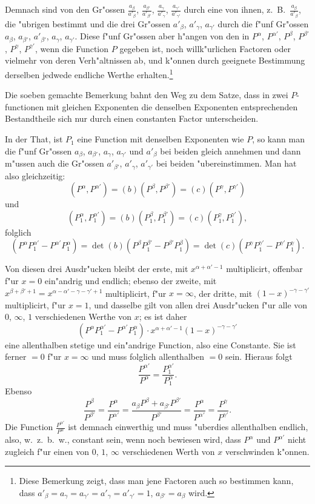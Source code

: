 \documentclass[12pt,a4paper]{article}
\begin{document}
Demnach sind von den Gr{"o}ssen $\frac{a_{\beta}}{a'_{\beta}}$, $\frac{a_{\beta'}}{a'_{\beta'}}$, $\frac{a_{\gamma}}{a'_{\gamma}}$, $\frac{a_{\gamma'}}{a'_{\gamma'}}$ durch eine von ihnen, z.~B.\ $\frac{a_{\beta}}{a'_{\beta}}$, die {"u}brigen bestimmt und die drei Gr{"o}ssen $a'_{\beta}$, $a'_{\gamma}$, $a_{\gamma'}$ durch die f{"u}nf Gr{"o}ssen $a_{\beta}$, $a_{\beta'}$, $a'_{\beta'}$, $a_{\gamma}$, $a_{\gamma'}$. Diese f{"u}nf Gr{"o}ssen aber h{"a}ngen von den in $P^{\alpha}$, $P^{\alpha'}$, $P^{\beta}$, $P^{\beta'}$, $P^{\gamma}$, $P^{\gamma'}$, wenn die Function $P$ gegeben ist, noch willk{"u}rlichen Factoren oder vielmehr von deren Verh{"a}ltnissen ab, und k{"o}nnen durch geeignete Bestimmung derselben jedwede endliche Werthe erhalten.\footnote{Diese Bemerkung zeigt, dass man jene Factoren auch so bestimmen kann, dass $a'_{\beta} = a_{\gamma} = a_{\gamma'} = a'_{\gamma} = a'_{\gamma'} = 1$, $a_{\beta'} = a_{\beta}$ wird.}

Die soeben gemachte Bemerkung bahnt den Weg zu dem Satze, dass in zwei $P$-functionen mit gleichen Exponenten die denselben Exponenten entsprechenden Bestandtheile sich nur durch einen constanten Factor unterscheiden.

In der That, ist $P_1$ eine Function mit denselben Exponenten wie $P$, so kann man die f{"u}nf Gr{"o}ssen $a_{\beta}$, $a_{\beta'}$, $a_{\gamma}$, $a_{\gamma'}$ und $a'_{\beta}$ bei beiden gleich annehmen und dann m{"u}ssen auch die Gr{"o}ssen $a'_{\beta'}$, $a'_{\gamma}$, $a'_{\gamma'}$ bei beiden {"u}bereinstimmen. Man hat also gleichzeitig:
\[
(P^{\alpha}, P^{\alpha'}) = (b)(P^{\beta}, P^{\beta'}) = (c)(P^{\gamma}, P^{\gamma'})
\]
und
\[
(P_1^{\alpha}, P_1^{\alpha'}) = (b)(P_1^{\beta}, P_1^{\beta'}) = (c)(P_1^{\gamma}, P_1^{\gamma'}),
\]
folglich
\[
(P^{\alpha} P_1^{\alpha'} - P^{\alpha'} P_1^{\alpha}) = \det(b)(P^{\beta} P_1^{\beta'} - P^{\beta'} P_1^{\beta}) = \det(c)(P^{\gamma} P_1^{\gamma'} - P^{\gamma'} P_1^{\gamma}).
\]

Von diesen drei Ausdr{"u}cken bleibt der erste, mit $x^{\alpha+\alpha'-1}$ multiplicirt, offenbar f{"u}r $x = 0$ ein{"a}ndrig und endlich; ebenso der zweite, mit $x^{\beta+\beta'+1} = x^{\alpha-\alpha'-\gamma-\gamma'+1}$ multiplicirt, f{"u}r $x = \infty$, der dritte, mit $(1-x)^{-\gamma-\gamma'}$ multiplicirt, f{"u}r $x = 1$, und dasselbe gilt von allen drei Ausdr{"u}cken f{"u}r alle von $0$, $\infty$, $1$ verschiedenen Werthe von $x$; es ist daher
\[
(P^{\alpha} P_1^{\alpha'} - P^{\alpha'} P_1^{\alpha}) \cdot x^{\alpha+\alpha'-1} (1-x)^{-\gamma-\gamma'}
\]
eine allenthalben stetige und ein{"a}ndrige Function, also eine Constante. Sie ist ferner $= 0$ f{"u}r $x = \infty$ und muss folglich allenthalben $= 0$ sein. Hieraus folgt
\[
\frac{P^{\alpha'}}{P^{\alpha}} = \frac{P_1^{\alpha'}}{P_1^{\alpha}}.
\]
Ebenso
\[
\frac{P^{\beta}}{P^{\beta'}} = \frac{P^{\alpha}}{P^{\alpha'}} = \frac{a_{\beta} P^{\beta} + a_{\beta'} P^{\beta'}}{P^{\beta'}} = \frac{P^{\alpha}}{P^{\alpha'}} = \frac{P^{\gamma}}{P^{\gamma'}}.
\]
Die Function $\frac{P^{\alpha'}}{P^{\alpha}}$ ist demnach einwerthig und muss {"u}berdies allenthalben endlich, also, w.~z.~b.~w., constant sein, wenn noch bewiesen wird, dass $P^{\alpha}$ und $P^{\alpha'}$ nicht zugleich f{"u}r einen von $0$, $1$, $\infty$ verschiedenen Werth von $x$ verschwinden k{"o}nnen.
\end{document}

